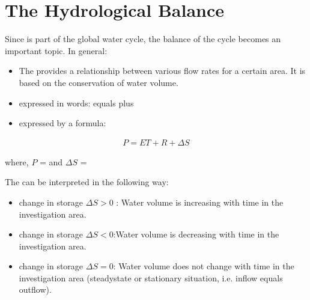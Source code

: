 \documentclass[letterpaper,10pt,english]{jupyterBook}
\begin{document}
\section{The Hydrological Balance}
\label{\detokenize{content/background/03_basic_hydrogeology:the-hydrological-balance}}
\sphinxAtStartPar
Since  is part of the global water cycle, the balance of the cycle becomes an important topic. In general:
\begin{itemize}
\item {} 
\sphinxAtStartPar
The  provides a relationship between various flow rates for a certain area. It is based on the conservation of water volume.

\item {} 
\sphinxAtStartPar
expressed in words:   equals  plus 

\item {} 
\sphinxAtStartPar
expressed by a formula:

\end{itemize}
\begin{equation*}
\begin{split}
P = ET + R + \Delta S
\end{split}
\end{equation*}
\begin{sphinxShadowBox}

\sphinxAtStartPar
where, 
\(P\) =   and  \(\Delta S\) = 
\end{sphinxShadowBox}

\sphinxAtStartPar
The  can be interpreted in the following way:
\begin{itemize}
\item {} 
\sphinxAtStartPar
change in storage \(\Delta S > 0\) : Water volume is increasing with time in the investigation area.

\item {} 
\sphinxAtStartPar
change in storage \(\Delta S < 0\):Water volume is decreasing with time in the investigation area.

\item {} 
\sphinxAtStartPar
change in storage \(\Delta S = 0\): Water volume does not change with time in the investigation area (steady\sphinxhyphen{}state or stationary situation, i.e. inflow equals outflow).

\end{itemize}
\end{document}
